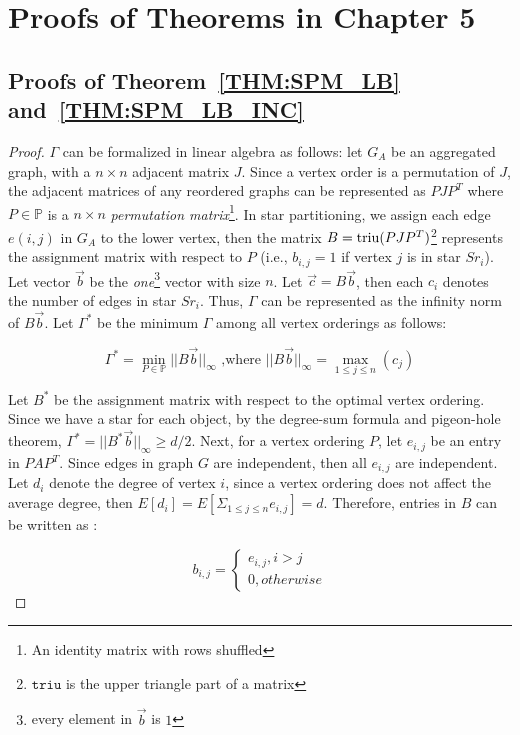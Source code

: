 \section{Proofs of Theorems in Chapter 5}
\subsection{Proofs of Theorem~\ref{THM:SPM_LB} and~\ref{THM:SPM_LB_INC}}
\label{apx:thm2proof}

\begin{proof}
$\Gamma$ can be formalized in linear algebra as follows:
let $G_A$ be an aggregated graph, with a $n \times n$ adjacent matrix $J$.
Since a vertex order is a permutation of $J$, the adjacent matrices 
of any reordered graphs can be represented as $PJP^T$
where $P \in \mathbb{P}$ is a $n\times n$ \emph{permutation matrix}\footnote{An identity matrix with rows shuffled}.
In star partitioning, we assign each edge $e(i,j)$ in $G_A$ to the lower vertex, 
then the matrix $B=\operatorname*{triu}(PJP^T)$\footnote{$\mathtt{triu}$ is the upper triangle part of a matrix}
represents the assignment matrix with respect to $P$ (i.e., $b_{i,j} = 1$ if vertex $j$ is in star $Sr_i$).
Let vector $\vec{b}$ be the \textit{one}\footnote{every element in $\vec{b}$ is $1$} 
vector with size $n$. Let $\vec{c} = B\vec{b}$, then each $c_i$ 
denotes the number of edges in star $Sr_i$. Thus, $\Gamma$ can be represented
as the infinity norm of $B\vec{b}$. Let $\Gamma^*$ be the minimum $\Gamma$ among all vertex orderings as follows:

\begin{equation}
\Gamma^* = \min_{P \in \mathbb{P}}{||B\vec{b}||_\infty} \text{ ,where } ||B\vec{b}||_\infty = \max_{1\leq j \leq n}(c_j)
\end{equation}

Let $B^*$ be the assignment matrix with respect to the optimal vertex ordering.
Since we have a star for each object, by the degree-sum formula and pigeon-hole theorem, 
$\Gamma^*=||B^*\vec{b}||_\infty \geq d/2$.
Next, for a vertex ordering $P$, let $e_{i,j}$ be an entry in $PAP^T$. Since 
edges in graph $G$ are independent, then all $e_{i,j}$ are independent. 
Let $d_i$ denote the degree of vertex $i$, since a vertex ordering does not
affect the average degree,
then $E[d_i]=E[\Sigma_{1\leq j \leq n}e_{i,j}]=d$. Therefore, 
entries in $B$ can be written as :

\begin{equation*}
b_{i,j} = \begin{cases}
			e_{i,j}, i>j \\
			0, otherwise
		  \end{cases}  
\end{equation*}


\end{proof}
